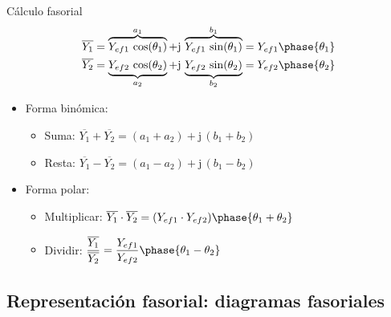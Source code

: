 \documentclass[aspectratio=169, xcolor={usenames,svgnames,dvipsnames}]{beamer}
\begin{document}
\begin{frame}{Cálculo fasorial}
\begin{align*}
    \overline{Y_1}&=\overbrace{Y_{ef1}\,\cos(\theta_1)}^{a_1}+\mathrm{j}\,\overbrace{Y_{ef1}\,\sin(\theta_1)}^{b_1}=Y_{ef1}\phase{\theta_1}\\
    \overline{Y_2}&=\underbrace{Y_{ef2}\,\cos(\theta_2)}_{a_2}+\mathrm{j}\,\underbrace{Y_{ef2}\,\sin(\theta_2)}_{b_2}=Y_{ef2}\phase{\theta_2}
\end{align*}
    \begin{itemize}
        \item Forma binómica:
        \begin{itemize}
            \item Suma: $\overline{Y_1}+\overline{Y_2}=(a_1+a_2)+\mathrm{j}\,(b_1+b_2)$
            \item Resta: $\overline{Y_1}-\overline{Y_2}=(a_1-a_2)+\mathrm{j}\,(b_1-b_2)$
        \end{itemize}
        \item Forma polar:
        \begin{itemize}
            \item Multiplicar: $\overline{Y_1}\cdot \overline{Y_2}=(Y_{ef1}\cdot Y_{ef2})\phase{\theta_1+\theta_2}$
            \item Dividir: $\dfrac{\overline{Y_1}}{\overline{Y_2}}=\dfrac{Y_{ef1}}{Y_{ef2}}\phase{\theta_1-\theta_2}$
        \end{itemize}
    \end{itemize}
\end{frame}

\subsection{Representación fasorial: diagramas fasoriales}
\end{document}
